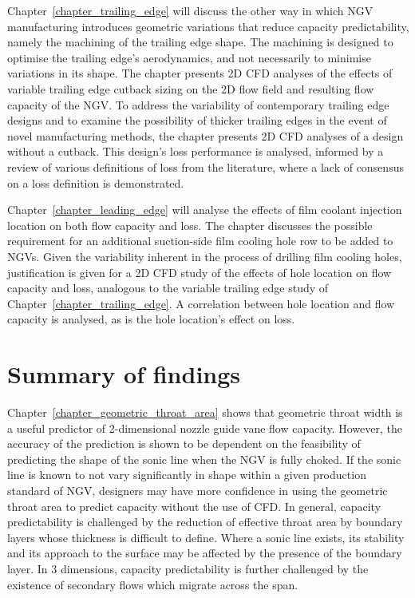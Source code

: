 \documentclass[a4paper, 11pt, oneside]{report}
\begin{document}
Chapter~\ref{chapter_trailing_edge} will discuss the other way in which NGV manufacturing introduces geometric variations that reduce capacity predictability, namely the machining of the trailing edge shape. The machining is designed to optimise the trailing edge's aerodynamics, and not necessarily to minimise variations in its shape. The chapter presents 2D CFD analyses of the effects of variable trailing edge cutback sizing on the 2D flow field and resulting flow capacity of the NGV. To address the variability of contemporary trailing edge designs and to examine the possibility of thicker trailing edges in the event of novel manufacturing methods, the chapter presents 2D CFD analyses of a design without a cutback. This design's loss performance is analysed, informed by a review of various definitions of loss from the literature, where a lack of consensus on a loss definition is demonstrated.

Chapter~\ref{chapter_leading_edge} will analyse the effects of film coolant injection location on both flow capacity and loss. The chapter discusses the possible requirement for an additional suction-side film cooling hole row to be added to NGVs. Given the variability inherent in the process of drilling film cooling holes, justification is given for a 2D CFD study of the effects of hole location on flow capacity and loss, analogous to the variable trailing edge study of Chapter~\ref{chapter_trailing_edge}. A correlation between hole location and flow capacity is analysed, as is the hole location's effect on loss.


\section{Summary of findings}

Chapter~\ref{chapter_geometric_throat_area} shows that geometric throat width is a useful predictor of 2-dimensional nozzle guide vane flow capacity. However, the accuracy of the prediction is shown to be dependent on the feasibility of predicting the shape of the sonic line when the NGV is fully choked. If the sonic line is known to not vary significantly in shape within a given production standard of NGV, designers may have more confidence in using the geometric throat area to predict capacity without the use of CFD. In general, capacity predictability is challenged by the reduction of effective throat area by boundary layers whose thickness is difficult to define. Where a sonic line exists, its stability and its approach to the surface may be affected by the presence of the boundary layer. In 3 dimensions, capacity predictability is further challenged by the existence of secondary flows which migrate across the span.
\end{document}
